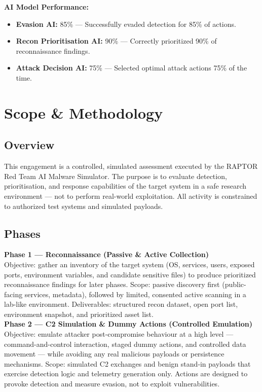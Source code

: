 \documentclass[a4paper,12pt]{article}
\begin{document}
\vspace{0.3cm}
\textbf{AI Model Performance:} \\
\begin{itemize}
    \item \textbf{Evasion AI:} 85\% — Successfully evaded detection for 85\% of actions.
    \item \textbf{Recon Prioritisation AI:} 90\% — Correctly prioritized 90\% of reconnaissance findings.
    \item \textbf{Attack Decision AI:} 75\% — Selected optimal attack actions 75\% of the time.
\end{itemize}

\newpage


\section*{Scope \& Methodology}

\subsection*{Overview}
This engagement is a controlled, simulated assessment executed by the RAPTOR Red Team AI Malware Simulator. 
The purpose is to evaluate detection, prioritisation, and response capabilities of the target system in a safe research environment — not to perform real-world exploitation. 
All activity is constrained to authorized test systems and simulated payloads. \\

\subsection*{Phases}
\textbf{Phase 1 — Reconnaissance (Passive \& Active Collection)} \\
Objective: gather an inventory of the target system (OS, services, users, exposed ports, environment variables, and candidate sensitive files) to produce prioritized reconnaissance findings for later phases.  
Scope: passive discovery first (public-facing services, metadata), followed by limited, consented active scanning in a lab-like environment.  
Deliverables: structured recon dataset, open port list, environment snapshot, and prioritized asset list. \\

\textbf{Phase 2 — C2 Simulation & Dummy Actions (Controlled Emulation)} \\
Objective: emulate attacker post‑compromise behaviour at a high level — command-and-control interaction, staged dummy actions, and controlled data movement — while avoiding any real malicious payloads or persistence mechanisms.  
Scope: simulated C2 exchanges and benign stand‑in payloads that exercise detection logic and telemetry generation only. Actions are designed to provoke detection and measure evasion, not to exploit vulnerabilities. \\
\end{document}
